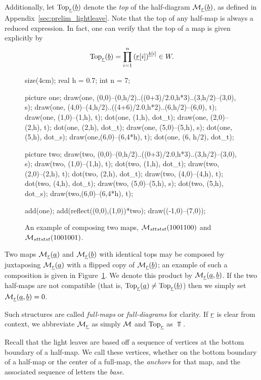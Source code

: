 Additionally, let $\operatorname{Top}_{\underline{r}}(\underline{b})$ denote the \emph{top} of the half-diagram $\mathcal M_{\underline{r}}(\underline{b})$, as defined in Appendix~\ref{sec:prelim_lightleave}.  
Note that the top of any half-map is always a reduced expression.  In fact, one can verify that the top of a map is given explicitly by
\begin{equation}
	\Top_{\ul r}(\ul b) = \prod_{i=1}^n \left( \ul r[i] \right)^{\ul b[i]} \in W.
	\label{eq:top}
\end{equation}

\begin{figure}[ht]
	\centering
	\begin{asy}
	size(4cm);
	real h = 0.7;
	int n = 7;

	picture one;
	draw(one, (0,0)--(0,h/2)..((0+3)/2.0,h*3)..(3,h/2)--(3,0), s);
	draw(one, (4,0)--(4,h/2)..((4+6)/2.0,h*2)..(6,h/2)--(6,0), t);
	draw(one, (1,0)--(1,h), t);
	dot(one, (1,h), dot_t);
	draw(one, (2,0)--(2,h), t);
	dot(one, (2,h), dot_t);
	draw(one, (5,0)--(5,h), s);
	dot(one, (5,h), dot_s);
	draw(one,(6,0)--(6,4*h), t);
	dot(one, (6, h/2), dot_t);

	picture two;
	draw(two, (0,0)--(0,h/2)..((0+3)/2.0,h*3)..(3,h/2)--(3,0), s);
	draw(two, (1,0)--(1,h), t);
	dot(two, (1,h), dot_t);
	draw(two, (2,0)--(2,h), t);
	dot(two, (2,h), dot_t);
	draw(two, (4,0)--(4,h), t);
	dot(two, (4,h), dot_t);
	draw(two, (5,0)--(5,h), s);
	dot(two, (5,h), dot_s);
	draw(two,(6,0)--(6,4*h), t);

	add(one); add(reflect((0,0),(1,0))*two);
	draw((-1,0)--(7,0));
	\end{asy}
	\caption{An example of composing two maps, $\mathcal M_{sttstst}(1001100)$ and $\mathcal M_{sttstst}(1001001)$.}
	\label{fig:example_compose}
\end{figure}

Two maps $\mathcal M_{\underline{r}}(\underline{a})$ and $\mathcal M_{\underline{r}}(\underline{b})$ with identical tops may be composed by juxtaposing $\mathcal M_{\underline{r}}(\underline{a})$ with a flipped copy of $\mathcal M_{\underline{r}}(\underline{b})$; an example of such a composition is given in Figure~\ref{fig:example_compose}.  We denote this product by $\mathcal M_{\underline{r}}(\underline{a}, \underline{b})$.  If the two half-maps are not compatible (that is, $\operatorname{Top}_{\underline{r}}(\underline{a}) \neq \operatorname{Top}_{\underline{r}}(\underline{b})$) then we simply set $\mathcal M_{\underline{r}}(\underline{a}, \underline{b}) = 0$.

Such structures are called \emph{full-maps} or \emph{full-diagrams} for clarity.  If $\underline{r}$ is clear from context, we abbreviate $\mathcal M_{\underline{r}}$ as simply $\mathcal M$ and $\operatorname{Top}_{\underline{r}}$ as $\Top$.

Recall that the light leaves are based off a sequence of vertices at the bottom boundary of a half-map.  We call these vertices, whether on the bottom boundary of a half-map or the center of a full-map, the \emph{anchors} for that map, and the associated sequence of letters the \emph{base}.  

